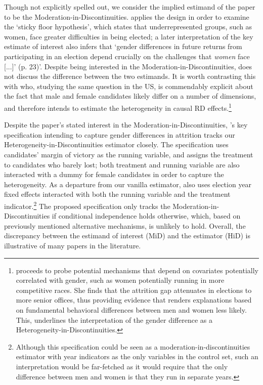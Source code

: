 \documentclass[12pt]{article}
\begin{document}
Though not explicitly spelled out, we consider the implied estimand of the paper to be the Moderation-in-Discontinuities. \citet{cipullo2021} applies the design in order to examine the `sticky floor hypothesis', which states that underrepresented groups, such as women, face greater difficulties in being elected; a later interpretation of the key estimate of interest also infers that `gender differences in future returns from participating in an election depend crucially on the challenges that \emph{women} face [...]' (p. 23)'. Despite being interested in the Moderation-in-Discontinuities, \citet{cipullo2021} does not discuss the difference between the two estimands. It is worth contrasting this with \citet{wasserman2018} who, studying the same question in the US, is commendably explicit about the fact that male and female candidates likely differ on a number of dimensions, and therefore intends to estimate the heterogeneity in causal RD effects.\footnote{\citet{wasserman2018} proceeds to probe potential mechanisms that depend on covariates potentially correlated with gender, such as women potentially running in more competitive races. She finds that the attrition gap attenuates in elections to more senior offices, thus providing evidence that renders explanations based on fundamental behavioral differences between men and women less likely. This, underlines the interpretation of the gender difference as a Heterogeneity-in-Discontinuities.}

Despite the paper's stated interest in the Moderation-in-Discontinuities, \citet{cipullo2021}'s key specification intending to capture gender differences in attrition tracks our Heterogeneity-in-Discontinuities estimator closely. The specification uses candidates' margin of victory as the running variable, and assigns the treatment to candidates who barely lost; both treatment and running variable are also interacted with a dummy for female candidates in order to capture the heterogeneity. As a departure from our vanilla estimator, \citet{cipullo2021} also uses election year fixed effects interacted with both the running variable and the treatment indicator.\footnote{Although this specification could be seen as a moderation-in-discontinuities estimator with year indicators as the only variables in the control set, such an interpretation would be far-fetched as it would require that the only difference between men and women is that they run in separate years.} The proposed specification only tracks the Moderation-in-Discontinuities if conditional independence holds otherwise, which, based on previously mentioned alternative mechanisms, is unlikely to hold. Overall, the discrepancy between the estimand of interest (MiD) and the estimator (HiD) is illustrative of many papers in the literature.
\end{document}
